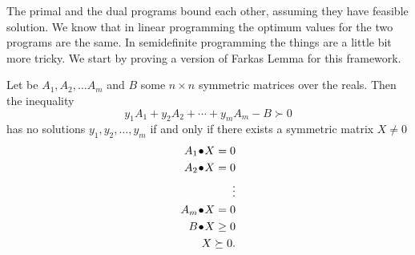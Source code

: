 \documentclass[a4paper,twoside,justified]{tufte-handout}
\begin{document}
The primal and the dual programs bound each other, assuming they have
feasible solution. We know that in linear programming the optimum
values for the two programs are the same. In semidefinite programming
the things are a little bit more tricky.  We start by proving a
version of Farkas Lemma for this framework.

\begin{lemma}
  \label{lmm:farkas_sdp}
  Let be $A_{1}, A_{2}, \ldots A_{m}$ and $B$ some $n \times n$
  symmetric matrices over the reals. Then the inequality
  \begin{equation}
    y_{1}A_{1}+y_{2}A_{2} + \cdots + y_{m}A_{m} - B \succ 0
  \end{equation}
  has no solutions $ y_{1}, y_{2}, \ldots,y_{m} $ if and only if there
  exists a symmetric matrix $ X\not=0 $
\begin{alignat*}{2}
  \pointwiseprod{A_{1}}{X} = 0\\
   \pointwiseprod{A_{2}}{X} = 0\\
   \vdots \\
   \pointwiseprod{A_{m}}{X} = 0 \\
   \pointwiseprod{B}{X} \geq 0\\
   X \succeq 0.
\end{alignat*}
\end{lemma}
\end{document}
